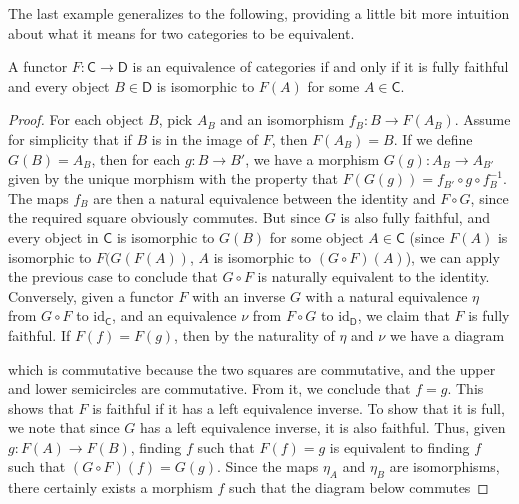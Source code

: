 The last example generalizes to the following, providing a little bit more intuition about what it means for two categories to be equivalent.

\begin{theorem}
    A functor $F: \mathsf{C} \to \mathsf{D}$ is an equivalence of categories if and only if it is fully faithful and every object $B \in \mathsf{D}$ is isomorphic to $F(A)$ for some $A \in \mathsf{C}$.
\end{theorem}
\begin{proof}
    For each object $B$, pick $A_B$ and an isomorphism $f_B: B \to F(A_B)$. Assume for simplicity that if $B$ is in the image of $F$, then $F(A_B) = B$. If we define $G(B) = A_B$, then for each $g: B \to B'$, we have a morphism $G(g): A_B \to A_{B'}$ given by the unique morphism with the property that $F(G(g)) = f_{B'} \circ g \circ f_B^{-1}$. The maps $f_B$ are then a natural equivalence between the identity and $F \circ G$, since the required square obviously commutes. But since $G$ is also fully faithful, and every object in $\mathsf{C}$ is isomorphic to $G(B)$ for some object $A \in \mathsf{C}$ (since $F(A)$ is isomorphic to $F(G(F(A))$, $A$ is isomorphic to $(G \circ F)(A)$), we can apply the previous case to conclude that $G \circ F$ is naturally equivalent to the identity. Conversely, given a functor $F$ with an inverse $G$ with a natural equivalence $\eta$ from $G \circ F$ to $\text{id}_{\mathsf{C}}$, and an equivalence $\nu$ from $F \circ G$ to $\text{id}_{\mathsf{D}}$, we claim that $F$ is fully faithful. If $F(f) = F(g)$, then by the naturality of $\eta$ and $\nu$ we have a diagram
    \begin{center}
    \end{center}
    which is commutative because the two squares are commutative, and the upper and lower semicircles are commutative. From it, we conclude that $f = g$. This shows that $F$ is faithful if it has a left equivalence inverse. To show that it is full, we note that since $G$ has a left equivalence inverse, it is also faithful. Thus, given $g: F(A) \to F(B)$, finding $f$ such that $F(f) = g$ is equivalent to finding $f$ such that $(G \circ F)(f) = G(g)$. Since the maps $\eta_A$ and $\eta_B$ are isomorphisms, there certainly exists a morphism $f$ such that the diagram below commutes

\end{proof}
